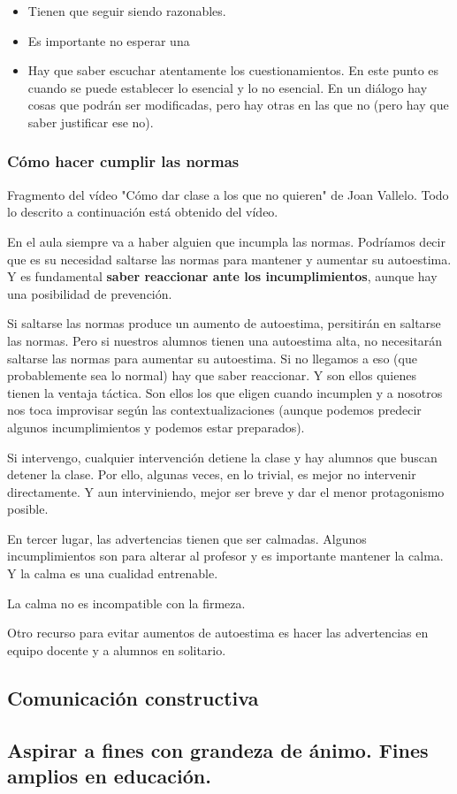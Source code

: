 \documentclass[palatino]{apuntesURJC}
\begin{document}
\begin{itemize}
	\item Tienen que seguir siendo razonables.
	\item Es importante no esperar una 
	\item Hay que saber escuchar atentamente los cuestionamientos. 
	En este punto es cuando se puede establecer lo esencial y lo no esencial.
	En un diálogo hay cosas que podrán ser modificadas, pero hay otras en las que no (pero hay que saber justificar ese no).
\end{itemize}


\subsubsection{Cómo hacer cumplir las normas}

Fragmento del vídeo "Cómo dar clase a los que no quieren" de Joan Vallelo.
%
Todo lo descrito a continuación está obtenido del vídeo.

En el aula siempre va a haber alguien que incumpla las normas.
%
Podríamos decir que es su necesidad saltarse las normas para mantener y aumentar su autoestima.
%
Y es fundamental \textbf{saber reaccionar ante los incumplimientos}, aunque hay una posibilidad de prevención.

Si saltarse las normas produce un aumento de autoestima, persitirán en saltarse las normas.
%
Pero si nuestros alumnos tienen una autoestima alta, no necesitarán saltarse las normas para aumentar su autoestima.
%
Si no llegamos a eso (que probablemente sea lo normal) hay que saber reaccionar.
%
Y son ellos quienes tienen la ventaja táctica. Son ellos los que eligen cuando incumplen y a nosotros nos toca improvisar según las contextualizaciones (aunque podemos predecir algunos incumplimientos y podemos estar preparados).

Si intervengo, cualquier intervención detiene la clase y hay alumnos que buscan detener la clase. 
%
Por ello, algunas veces, en lo trivial, es mejor no intervenir directamente.
%
Y aun interviniendo, mejor ser breve y dar el menor protagonismo posible.

En tercer lugar, las advertencias tienen que ser calmadas. 
%
Algunos incumplimientos son para alterar al profesor y es importante mantener la calma. 
%
Y la calma es una cualidad entrenable.

La calma no es incompatible con la firmeza.

Otro recurso para evitar aumentos de autoestima es hacer las advertencias en equipo docente y a alumnos en solitario.



\subsection{Comunicación constructiva}

\subsection{Aspirar a fines con grandeza de ánimo. Fines amplios en educación.}



\appendix



\printindex
\end{document}

